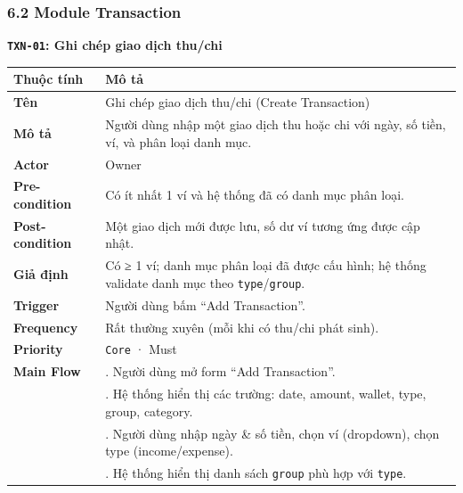 \documentclass[11pt,a4paper]{article}
\newcounter{none}
\newcommand{\faintline}{%
  \noalign{\global\arrayrulecolor{faintgray}}%
  \hline
  \noalign{\global\arrayrulecolor{black}}%
} %
\begin{document}
\subsubsection{6.2 Module Transaction}\label{module-transaction}

\textbf{\texttt{TXN-01}: Ghi chép giao dịch thu/chi}

{\def\LTcaptype{none}
\begin{longtable}[]{@{}
  >{\raggedright\arraybackslash}p{}
  >{\raggedright\arraybackslash}p{}@{}}
\toprule\noalign{}
\begin{minipage}[b]{\linewidth}\raggedright
Thuộc tính
\end{minipage} & \begin{minipage}[b]{\linewidth}\raggedright
Mô tả
\end{minipage} \\
\midrule\noalign{}
\endhead
\bottomrule\noalign{}
\endlastfoot
\textbf{Tên} & Ghi chép giao dịch thu/chi (Create Transaction) \\ \faintline
\textbf{Mô tả} & Người dùng nhập một giao dịch thu hoặc chi với ngày, số tiền, ví, và phân loại danh mục. \\ \faintline
\textbf{Actor} & Owner \\ \faintline
\textbf{Pre-condition} & Có ít nhất 1 ví và hệ thống đã có danh mục phân loại. \\ \faintline
\textbf{Post-condition} & Một giao dịch mới được lưu, số dư ví tương ứng được cập nhật. \\ \faintline
\textbf{Giả định} & Có ≥ 1 ví; danh mục phân loại đã được cấu hình; hệ thống validate danh mục theo \texttt{type}/\texttt{group}. \\ \faintline
\textbf{Trigger} & Người dùng bấm ``Add Transaction''. \\ \faintline
\textbf{Frequency} & Rất thường xuyên (mỗi khi có thu/chi phát sinh). \\ \faintline
\textbf{Priority} & \texttt{Core} · Must \\ \faintline
\textbf{Main Flow} & 1. Người dùng mở form ``Add Transaction''.\\
&2. Hệ thống hiển thị các trường: date, amount, wallet, type, group, category.\\
&3. Người dùng nhập ngày \& số tiền, chọn ví (dropdown), chọn type (income/expense).\\
&4. Hệ thống hiển thị danh sách \texttt{group} phù hợp với \texttt{type}.\\

\end{longtable}}
\end{document}
